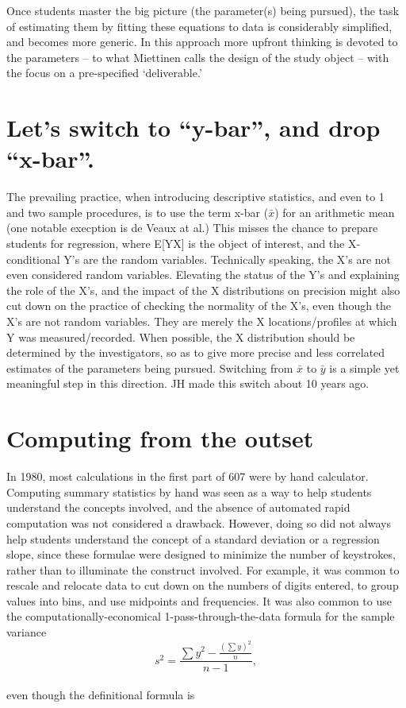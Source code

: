 \documentclass[]{book}
\begin{document}
Once students master the big picture (the parameter(s) being pursued), the task of estimating them by fitting these equations to data is considerably simplified, and becomes more generic. In this approach more upfront thinking is devoted to the parameters -- to what Miettinen calls the design of the study object -- with the focus on a pre-specified `deliverable.'

\hypertarget{lets-switch-to-y-bar-and-drop-x-bar.}{%
\section{Let's switch to ``y-bar'', and drop ``x-bar''.}\label{lets-switch-to-y-bar-and-drop-x-bar.}}

The prevailing practice, when introducing descriptive statistics, and even to 1 and two sample procedures, is to use the term x-bar (\(\bar{x}\)) for an arithmetic mean (one notable execption is de Veaux at al.) This misses the chance to prepare students for regression, where E{[}Y\textbar{}X{]} is the object of interest, and the X-conditional Y's are the random variables. Technically speaking, the X's are not even considered random variables. Elevating the status of the Y's and explaining the role of the X's, and the impact of the X distributions on precision might also cut down on the practice of checking the normality of the X's, even though the X's are not random variables. They are merely the X locations/profiles at which Y was measured/recorded. When possible, the X distribution should be determined by the investigators, so as to give more precise and less correlated estimates of the parameters being pursued. Switching from \(\bar{x}\) to \(\bar{y}\) is a simple yet meaningful step in this direction. JH made this switch about 10 years ago.

\hypertarget{computing-from-the-outset}{%
\section{Computing from the outset}\label{computing-from-the-outset}}

In 1980, most calculations in the first part of 607 were by hand calculator. Computing summary statistics by hand was seen as a way to help students understand the concepts involved, and the absence of automated rapid computation was not considered a drawback. However,
doing so did not always help students understand the concept of a standard deviation or a regression slope, since these formulae were designed to minimize the number of keystrokes, rather than to illuminate the construct involved. For example, it was common to rescale and relocate data to cut down on the numbers of digits entered, to group values into bins, and use midpoints and frequencies. It was also common to use the computationally-economical 1-pass-through-the-data formula for the sample variance
\[s^2 =   \frac{ \sum y^2 - \frac{(\sum y)^2}{n}}{n-1},\]\\
even though the definitional formula is
\end{document}
